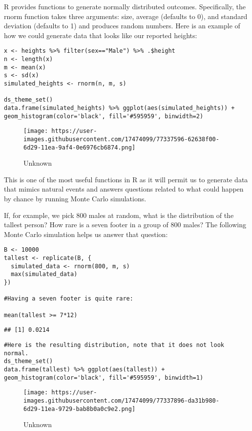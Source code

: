 \documentclass[
]{article}
\begin{document}
R provides functions to generate normally distributed outcomes.
Specifically, the rnorm function takes three arguments: size, average
(defaults to 0), and standard deviation (defaults to 1) and produces
random numbers. Here is an example of how we could generate data that
looks like our reported heights:

\begin{verbatim}
x <- heights %>% filter(sex=="Male") %>% .$height
n <- length(x)
m <- mean(x)
s <- sd(x)
simulated_heights <- rnorm(n, m, s)

ds_theme_set()
data.frame(simulated_heights) %>% ggplot(aes(simulated_heights)) + geom_histogram(color='black', fill='#595959', binwidth=2)
\end{verbatim}

\begin{figure}
\centering
\texttt{[image: https://user-images.githubusercontent.com/17474099/77337596-62638f00-6d29-11ea-9af4-0e6976cb6874.png]}
\caption{Unknown}
\end{figure}

This is one of the most useful functions in R as it will permit us to
generate data that mimics natural events and answers questions related
to what could happen by chance by running Monte Carlo simulations.

If, for example, we pick 800 males at random, what is the distribution
of the tallest person? How rare is a seven footer in a group of 800
males? The following Monte Carlo simulation helps us answer that
question:

\begin{verbatim}
B <- 10000
tallest <- replicate(B, {
  simulated_data <- rnorm(800, m, s)
  max(simulated_data)
})

#Having a seven footer is quite rare:

mean(tallest >= 7*12)
\end{verbatim}

\begin{verbatim}
## [1] 0.0214
\end{verbatim}

\begin{verbatim}
#Here is the resulting distribution, note that it does not look normal.
ds_theme_set()
data.frame(tallest) %>% ggplot(aes(tallest)) + geom_histogram(color='black', fill='#595959', binwidth=1)
\end{verbatim}

\begin{figure}
\centering
\texttt{[image: https://user-images.githubusercontent.com/17474099/77337896-da31b980-6d29-11ea-9729-bab8b0a0c9e2.png]}
\caption{Unknown}
\end{figure}
\end{document}
